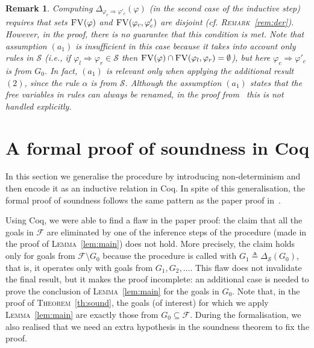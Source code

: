 \documentclass[conference]{IEEEtran}
\newenvironment{todo}{\medskip\hrule\smallskip\noindent}{\smallskip\hrule\medskip}
\newcommand{\dl}[1]{\begin{todo}\textcolor{blue}{Dorel:}\\ \color{red}{#1}\color{black}\end{todo}}
\newcommand{\dl}[1]{}
\newcommand{\eqbydef}{\triangleq}
\newcommand{\F}{\mathcal{F}}
\renewcommand{\S}{\mathcal{S}}
\newcommand{\Ra}{\Rightarrow}
\newcommand{\FreeVars}{\mathit{\textsc{FV}}}
\newcommand{\rrule}[2]{{#1} \Ra{#2}}
\newtheorem{remark}{Remark}
\begin{document}
\begin{remark}
\label{rem:der2}
Computing $\Delta_{\rrule{\varphi_c}{\varphi'_c}}(\varphi)$ (in the second case of the inductive step) requires that sets $\FreeVars(\varphi)$ and $\FreeVars(\varphi_c,\varphi'_c)$ are disjoint (cf. \textsc{Remark}~\ref{rem:der}).
However, in the proof, there is no guarantee that this condition is met. %
Note that assumption $(a_1)$
 is insufficient in this case because it takes into account only rules in $\S$ (i.e., if $\rrule{\varphi_l}{\varphi_r}\in\S$ then $\FreeVars(\varphi) \cap \FreeVars(\varphi_l, \varphi_r) = \emptyset$), but here $\rrule{\varphi_c}{\varphi'_c}$ is from $G_0$.
In fact, $(a_1)$ is relevant only when applying the additional result $(2)$, since the rule $\alpha$ is from $\S$.
Although the assumption $(a_1)$ states that {\it the free variables in rules can always be renamed}, in the proof from~\cite{lucanu-rusu-arusoaie-nowak-LRC2015} this is not handled explicitly.
\end{remark}



\section{A formal proof of soundness in Coq}
\label{sec:proof}

In this section we generalise the procedure by introducing non-determinism and then encode it as an inductive relation in Coq. 
In spite of this generalisation, the formal proof of soundness follows the same pattern as the paper proof in~\cite{lucanu-rusu-arusoaie-nowak-LRC2015}.

Using Coq, we were able to find a flaw in the paper proof: the claim that all the goals in $\F$ are eliminated by one of the inference steps of the procedure (made in the proof of \textsc{Lemma}~\ref{lem:main}) does not hold. 
More precisely, the claim holds only for goals from $\F\setminus G_0$ because the procedure is called with $G_1 \eqbydef \Delta_\S(G_0)$, that is, it operates only with goals from $G_1, G_2, \ldots$. 
This flaw does not invalidate the final result, but it makes the proof incomplete: an additional case is needed to prove the conclusion of \textsc{Lemma}~\ref{lem:main} for the goals in $G_0$.
Note that, in the proof of \textsc{Theorem}~\ref{th:sound}, the goals (of interest) for which we apply \textsc{Lemma}~\ref{lem:main} are exactly those from $G_0 \subseteq \F$.
During the formalisation, we also realised that we need an extra hypothesis in the soundness theorem to fix the proof. 
\end{document}
